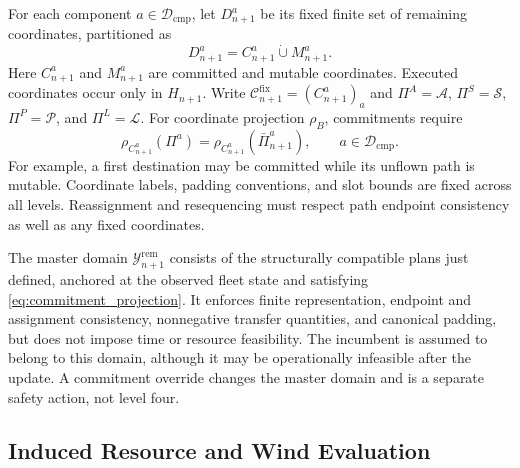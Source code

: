 For each component $a\in\mathcal D_{\mathrm{cmp}}$, let $D_{n+1}^a$ be
its fixed finite set of remaining coordinates, partitioned as
\begin{equation}
D_{n+1}^a=C_{n+1}^a\mathbin{\dot\cup}M_{n+1}^a.
\label{eq:decision_partition}
\end{equation}
Here $C_{n+1}^a$ and $M_{n+1}^a$ are committed and mutable coordinates.
Executed coordinates occur only in $H_{n+1}$.
Write $\mathcal C_{n+1}^{\mathrm{fix}}=(C_{n+1}^a)_a$ and
$\Pi^A=\mathcal A$, $\Pi^S=\mathcal S$, $\Pi^P=\mathcal P$, and
$\Pi^L=\mathcal L$. For coordinate projection $\rho_B$, commitments require
\begin{equation}
\rho_{C_{n+1}^a}(\Pi^a)
=\rho_{C_{n+1}^a}(\bar\Pi_{n+1}^a),
\qquad a\in\mathcal D_{\mathrm{cmp}}.
\label{eq:commitment_projection}
\end{equation}
For example, a first destination may be committed while its unflown path
is mutable. Coordinate labels, padding conventions, and slot bounds are
fixed across all levels. Reassignment and resequencing must respect path
endpoint consistency as well as any fixed coordinates.

The master domain $\mathcal Y_{n+1}^{\mathrm{rem}}$ consists of the
structurally compatible plans just defined, anchored at the observed fleet
state and satisfying \eqref{eq:commitment_projection}. It enforces finite
representation, endpoint and assignment consistency, nonnegative transfer
quantities, and canonical padding, but does not impose time or
resource feasibility. The incumbent is assumed to belong to this domain,
although it may be operationally infeasible after the update.
A commitment override changes the master domain and is a separate safety
action, not level four.

\subsection{Induced Resource and Wind Evaluation}
\label{subsec:resource_wind_evaluation}

